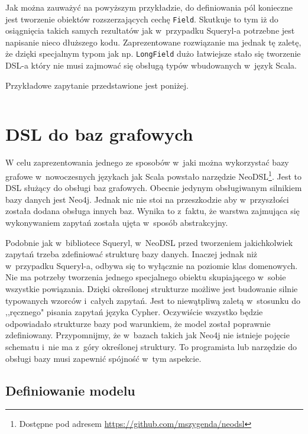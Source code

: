 \documentclass[brudnopis]{xmgr}
\begin{document}
\inputminted{scala}{listings/scala/rogue-model.scala}

Jak można zauważyć na powyższym przykładzie, do definiowania pól konieczne jest tworzenie obiektów rozszerzających cechę \texttt{Field}. Skutkuje to tym iż do osiągnięcia takich samych rezultatów jak w~przypadku Squeryl-a potrzebne jest napisanie nieco dłuższego kodu. Zaprezentowane rozwiązanie ma jednak tę zaletę, że dzięki specjalnym typom jak np. \texttt{LongField} dużo łatwiejsze stało się tworzenie DSL-a który nie musi zajmować się obsługą typów wbudowanych w~język Scala.

\medskip\noindent Przykładowe zapytanie przedstawione jest poniżej.

\inputminted{scala}{listings/scala/rogue-query.scala}

\chapter{DSL do baz grafowych}

W celu zaprezentowania jednego ze sposobów w~jaki można wykorzystać bazy grafowe w~nowoczesnych językach jak Scala powstało narzędzie NeoDSL\footnote{Dostępne pod adresem \url{https://github.com/mszygenda/neodsl}}. Jest to DSL służący do obsługi baz grafowych.
Obecnie jedynym obsługiwanym silnikiem bazy danych jest Neo4j. Jednak nic nie stoi na przeszkodzie aby w~przyszłości została dodana obsługa innych baz. Wynika to z~faktu, że warstwa zajmująca się wykonywaniem zapytań została ujęta w~sposób abstrakcyjny.

Podobnie jak w~bibliotece Squeryl, w~NeoDSL przed tworzeniem jakichkolwiek zapytań trzeba zdefiniować strukturę bazy danych. Inaczej jednak niż w~przypadku Squeryl-a, odbywa się to wyłącznie na poziomie klas domenowych. Nie ma potrzeby tworzenia jednego specjalnego obiektu skupiającego w~sobie wszystkie powiązania. Dzięki określonej strukturze możliwe jest budowanie silnie typowanych wzorców i~całych zapytań. Jest to niewątpliwą zaletą w~stosunku do ,,ręcznego" pisania zapytań języka Cypher. Oczywiście wszystko będzie odpowiadało strukturze bazy pod warunkiem, że model został poprawnie zdefiniowany. Przypomnijmy, że w~bazach takich jak Neo4j nie istnieje pojęcie schematu i~nie ma z~góry określonej struktury. To programista lub narzędzie do obsługi bazy musi zapewnić spójność w~tym aspekcie.

\section{Definiowanie modelu}
\end{document}
